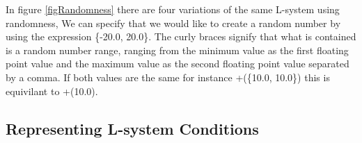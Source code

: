 \begin{flushleft}

In figure \ref{figRandomness} there are four variations of the same L-system using randomness, We can specify that we would like to create a random number by using the expression \{-20.0, 20.0\}. The curly braces signify that what is contained is a random number range, ranging from the minimum value as the first floating point value and the maximum value as the second floating point value separated by a comma. If both values are the same for instance +(\{10.0, 10.0\}) this is equivilant to +(10.0).

\end{flushleft}

\subsection{Representing L-system Conditions}

